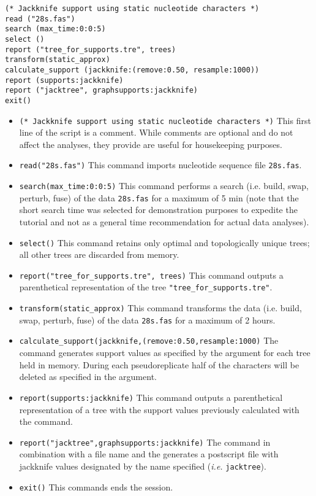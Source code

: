 \begin{verbatim}
(* Jackknife support using static nucleotide characters *)
read ("28s.fas")
search (max_time:0:0:5)
select ()
report ("tree_for_supports.tre", trees)
transform(static_approx)
calculate_support (jackknife:(remove:0.50, resample:1000))
report (supports:jackknife)
report ("jacktree", graphsupports:jackknife)
exit()
\end{verbatim}
\begin{itemize}
\item \texttt{(* Jackknife support using static nucleotide characters *)} This first line of the script is a comment. While comments are optional and do not affect the analyses, they provide are useful for housekeeping purposes.
\item \texttt{read("28s.fas")} This command imports nucleotide sequence file \texttt{28s.fas}.
\item \texttt{search(max\_time:0:0:5)} This command performs a search (i.e. build, swap, perturb, fuse) of the data \texttt{28s.fas} for a maximum of 5 min (note that the short search time was selected for demonstration purposes to expedite the tutorial and not as a general time recommendation for actual data analyses).   
\item \texttt{select()} This command retains only optimal and topologically unique trees; all other trees are discarded from memory. 
\item \texttt{report("tree\_for\_supports.tre", trees)}  This command outputs a parenthetical representation of the tree \texttt{"tree\_for\_supports.tre"}.
\item \texttt{transform(static\_approx)} This command transforms the data (i.e. build, swap, perturb, fuse) of the data \texttt{28s.fas} for a maximum of 2 hours.
\item \texttt{calculate\_support(jackknife,(remove:0.50,resample:1000)} The  command generates support values as specified by the  argument for each tree held in memory. During each pseudoreplicate half of the characters will be deleted as specified in the argument. 
\item \texttt{report(supports:jackknife)}  This command outputs a parenthetical representation of a tree with the support values previously calculated with the  command. 
\item \texttt{report("jacktree",graphsupports:jackknife)}  The  command in combination with a file name and the  generates a postscript file with jackknife values designated by the name specified (\emph{i.e.} \texttt{jacktree}). 
\item \texttt{exit()} This commands ends the \poy session.
\end{itemize}

